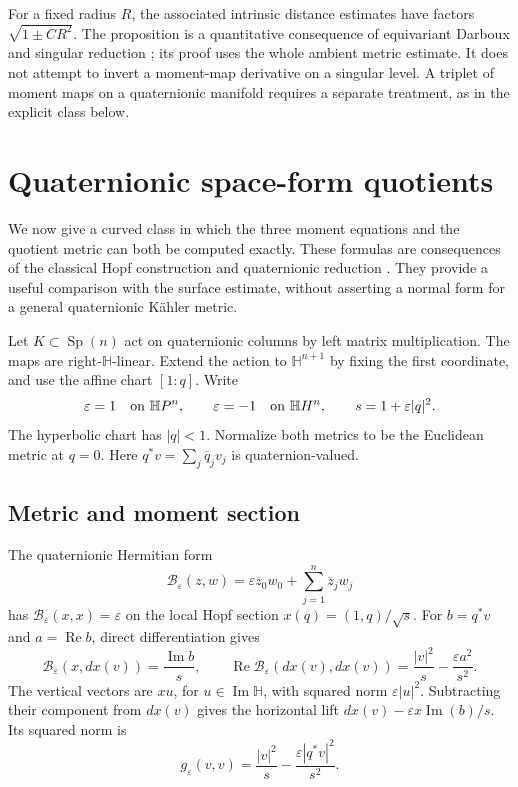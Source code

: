 \documentclass[11pt]{amsart}
\theoremstyle{definition}
\theoremstyle{remark}
\newcommand{\Hh}{\mathbb H}
\newcommand{\Sp}{\operatorname{Sp}}
\DeclareMathOperator{\Rea}{Re}
\begin{document}
For a fixed radius $R$, the associated intrinsic distance estimates
have factors $\sqrt{1\pm CR^2}$. The proposition is a quantitative
consequence of equivariant Darboux and singular reduction
\cite{SL91,Sja95}; its proof uses the whole ambient metric estimate.
It does not attempt to invert a moment-map derivative on a singular
level. A triplet of moment maps on a quaternionic manifold requires
a separate treatment, as in the explicit class below.

\section{Quaternionic space-form quotients}\label{sec:quaternionic}

We now give a curved class in which the three moment equations and
the quotient metric can both be computed exactly. These formulas are
consequences of the classical Hopf construction and quaternionic
reduction \cite{GL88,Swa90}. They provide a useful comparison with
the surface estimate, without asserting a normal form for a general
quaternionic Kähler metric.

Let $K\subset\Sp(n)$ act on quaternionic columns by left matrix
multiplication. The maps are right-$\Hh$-linear. Extend the action
to $\Hh^{n+1}$ by fixing the first coordinate, and use the affine
chart $[1:q]$. Write
\[
 \varepsilon=1\quad\hbox{on }\Hh P^n,\qquad
 \varepsilon=-1\quad\hbox{on }\Hh H^n,\qquad
 s=1+\varepsilon|q|^2.
\]
The hyperbolic chart has $|q|<1$. Normalize both metrics to be the
Euclidean metric at $q=0$. Here $q^*v=\sum_j\overline q_jv_j$
is quaternion-valued.

\subsection{Metric and moment section}
The quaternionic Hermitian form
\[
 \mathcal B_\varepsilon(z,w)
   =\varepsilon\overline z_0w_0+\sum_{j=1}^n\overline z_jw_j
\]
has $\mathcal B_\varepsilon(x,x)=\varepsilon$ on the local Hopf
section $x(q)=(1,q)/\sqrt{s}$. For $b=q^*v$ and $a=\Rea b$,
direct differentiation gives
\[
 \mathcal B_\varepsilon(x,dx(v))=\frac{\operatorname{Im}b}{s},
 \qquad
 \Rea\mathcal B_\varepsilon(dx(v),dx(v))
      =\frac{|v|^2}{s}-\frac{\varepsilon a^2}{s^2}.
\]
The vertical vectors are $xu$, for $u\in\operatorname{Im}\Hh$,
with squared norm $\varepsilon|u|^2$. Subtracting their component
from $dx(v)$ gives the horizontal lift
$dx(v)-\varepsilon x\operatorname{Im}(b)/s$. Its squared norm is
\begin{equation}\label{eq:qkmetric}
 g_\varepsilon(v,v)
      =\frac{|v|^2}{s}-\frac{\varepsilon|q^*v|^2}{s^2}.
\end{equation}
\end{document}
